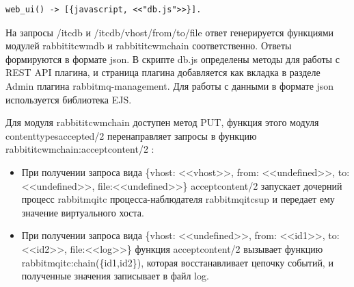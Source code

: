 {\begin{lstlisting}
web_ui() -> [{javascript, <<"db.js">>}].
\end{lstlisting}
На запросы /itc\underline{\hspace{0.25cm}}db и /itc\underline{\hspace{0.25cm}}db/vhost/from/to/file ответ генерируется функциями модулей rabbit\underline{\hspace{0.25cm}}itc\underline{\hspace{0.25cm}}wm\underline{\hspace{0.25cm}}db и rabbit\underline{\hspace{0.25cm}}itc\underline{\hspace{0.25cm}}wm\underline{\hspace{0.25cm}}chain соответственно. Ответы формируются в формате json. В скрипте db.js определены методы для работы с REST API плагина, и страница плагина добавляется как вкладка в разделе Admin плагина rabbitmq-management. Для работы с данными в формате json используется библиотека EJS. \par
Для модуля  rabbit\underline{\hspace{0.25cm}}itc\underline{\hspace{0.25cm}}wm\underline{\hspace{0.25cm}}chain доступен метод PUT, функция этого модуля content\underline{\hspace{0.25cm}}types\underline{\hspace{0.25cm}}accepted/2 перенаправляет запросы в функцию  rabbit\underline{\hspace{0.25cm}}itc\underline{\hspace{0.25cm}}wm\underline{\hspace{0.25cm}}chain:accept\underline{\hspace{0.25cm}}content/2 :
\begin{itemize}
\item  При получении запроса вида \{vhost: <<vhost>>, from: <<undefined>>, to:<<undefined>>, file:<<undefined>>\} accept\underline{\hspace{0.25cm}}content/2 запускает дочерний процесс rabbitmq\underline{\hspace{0.25cm}}itc процесса-наблюдателя rabbitmq\underline{\hspace{0.25cm}}itc\underline{\hspace{0.25cm}}sup и передает ему значение виртуального хоста.
\item  При получении запроса вида \{vhost: <<undefined>>, from: <<id\underline{\hspace{0.25cm}}1>>, to:<<id\underline{\hspace{0.25cm}}2>>, file:<<log>>\} функция accept\underline{\hspace{0.25cm}}content/2 вызывает функцию rabbitmq\underline{\hspace{0.25cm}}itc:chain(\{id\underline{\hspace{0.25cm}}1,id\underline{\hspace{0.25cm}}2\}), которая восстанавливает цепочку событий, и полученные значения записывает в файл log.

\end{itemize}}
